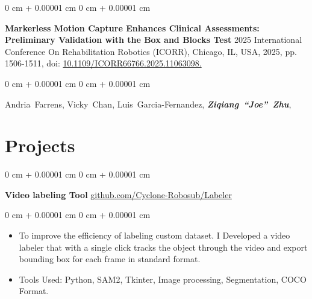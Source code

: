 \documentclass[10pt, letterpaper]{article}
\newenvironment{highlights}{
    \begin{itemize}[
        topsep=0.10 cm,
        parsep=0.10 cm,
        partopsep=0pt,
        itemsep=0pt,
        leftmargin=0 cm + 10pt
    ]
}{
    \end{itemize}
} %
\newenvironment{onecolentry}{
    \begin{adjustwidth}{
        0 cm + 0.00001 cm
    }{
        0 cm + 0.00001 cm
    }
}{
    \end{adjustwidth}
} %
\newenvironment{twocolentry}[2][]{
    \onecolentry
    \def\secondColumn{#2}
    \setcolumnwidth{\fill, 6 cm}
    \begin{paracol}{2}
}{
    \switchcolumn \raggedleft \secondColumn
    \end{paracol}
    \endonecolentry
} %
\begin{document}
        
        \begin{samepage}
            \begin{onecolentry}
                \textbf{Markerless Motion Capture Enhances Clinical Assessments: Preliminary Validation with the Box and Blocks Test} 2025 International Conference On Rehabilitation Robotics (ICORR), Chicago, IL, USA, 2025, pp. 1506-1511, doi: \href{https://doi.org/10.1109/ICORR66766.2025.11063098}{10.1109/ICORR66766.2025.11063098.}
            \end{onecolentry}

            \vspace{0.10 cm}
            
            \begin{onecolentry}
                \mbox{Andria Farrens}, \mbox{Vicky Chan}, \mbox{Luis Garcia-Fernandez}, \mbox{\textbf{\textit{Ziqiang “Joe” Zhu}}},

                \vspace{0.10 cm}
                
        \end{onecolentry}
        \end{samepage}


    
    \section{Projects}



        
        \begin{twocolentry}{
            \href{https://github.com/Cyclone-Robosub/Labeler}{github.com/Cyclone-Robosub/Labeler}
        }
            \textbf{Video labeling Tool}\end{twocolentry}

        \vspace{0.10 cm}
        \begin{onecolentry}
            \begin{highlights}
                \item To improve the efficiency of labeling custom dataset. I Developed a video labeler that with a single click tracks the object through the video and export bounding box for each frame in standard format.  
                \item Tools Used: Python, SAM2, Tkinter, Image processing, Segmentation, COCO Format. 
            \end{highlights}
        \end{onecolentry}
\end{document}
